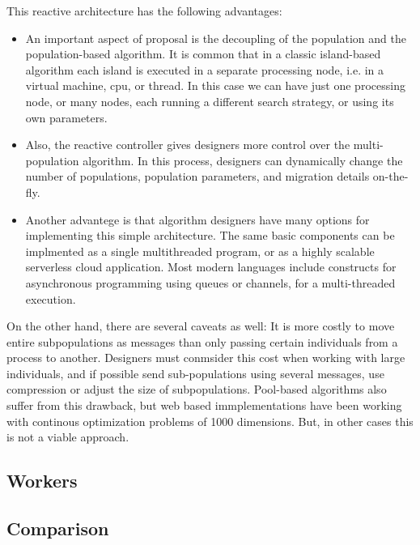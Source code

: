 \documentclass[review]{elsarticle}
\begin{document}
This reactive architecture has the following advantages:\begin{itemize}
\item 
An important aspect of proposal is the decoupling of the population and 
the population-based algorithm. It is common that in a classic island-based algorithm
each island is executed in a separate processing node, i.e. in a virtual machine, cpu,
or thread. In this case we can have just one processing node, or many nodes, each 
running a different search strategy, or using its own parameters. 
\item 
Also, the reactive controller gives designers more control over the multi-population algorithm.
In this process, designers can dynamically change the number of populations, population parameters,
and migration details on-the-fly.
\item 
Another advantege is that algorithm designers have many options for implementing this simple architecture. 
The same basic components can be implmented as a single multithreaded program, or 
as a highly scalable serverless cloud application. Most modern languages include 
constructs for asynchronous programming using queues or channels, for a multi-threaded
execution.
\end{itemize}

On the other hand, there are several caveats as well:
It is more costly to move entire subpopulations as messages than only passing certain individuals 
from a process to another. Designers must conmsider this cost when working with large
individuals, and if possible send sub-populations using several messages, use compression or 
adjust the size of subpopulations. Pool-based algorithms also suffer from this drawback, but 
web based immplementations have been working with continous optimization problems of 1000 dimensions.
But, in other cases this is not a viable approach. 

\subsection{Workers} 
\label{edm}

\subsection{Comparison} 
\label{edm}
\end{document}
